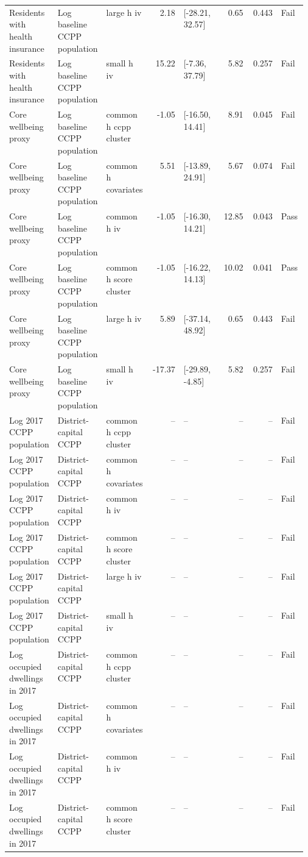 \begin{longtable}{@{}p{0.16\linewidth}p{0.14\linewidth}p{0.14\linewidth}rp{0.13\linewidth}rrl@{}}
Residents with health insurance & Log baseline CCPP population & large h iv & 2.18 & [-28.21, 32.57] & 0.65 & 0.443 & Fail \\
Residents with health insurance & Log baseline CCPP population & small h iv & 15.22 & [-7.36, 37.79] & 5.82 & 0.257 & Fail \\
Core wellbeing proxy & Log baseline CCPP population & common h ccpp cluster & -1.05 & [-16.50, 14.41] & 8.91 & 0.045 & Fail \\
Core wellbeing proxy & Log baseline CCPP population & common h covariates & 5.51 & [-13.89, 24.91] & 5.67 & 0.074 & Fail \\
Core wellbeing proxy & Log baseline CCPP population & common h iv & -1.05 & [-16.30, 14.21] & 12.85 & 0.043 & Pass \\
Core wellbeing proxy & Log baseline CCPP population & common h score cluster & -1.05 & [-16.22, 14.13] & 10.02 & 0.041 & Pass \\
Core wellbeing proxy & Log baseline CCPP population & large h iv & 5.89 & [-37.14, 48.92] & 0.65 & 0.443 & Fail \\
Core wellbeing proxy & Log baseline CCPP population & small h iv & -17.37 & [-29.89, -4.85] & 5.82 & 0.257 & Fail \\
Log 2017 CCPP population & District-capital CCPP & common h ccpp cluster & -- & -- & -- & -- & Fail \\
Log 2017 CCPP population & District-capital CCPP & common h covariates & -- & -- & -- & -- & Fail \\
Log 2017 CCPP population & District-capital CCPP & common h iv & -- & -- & -- & -- & Fail \\
Log 2017 CCPP population & District-capital CCPP & common h score cluster & -- & -- & -- & -- & Fail \\
Log 2017 CCPP population & District-capital CCPP & large h iv & -- & -- & -- & -- & Fail \\
Log 2017 CCPP population & District-capital CCPP & small h iv & -- & -- & -- & -- & Fail \\
Log occupied dwellings in 2017 & District-capital CCPP & common h ccpp cluster & -- & -- & -- & -- & Fail \\
Log occupied dwellings in 2017 & District-capital CCPP & common h covariates & -- & -- & -- & -- & Fail \\
Log occupied dwellings in 2017 & District-capital CCPP & common h iv & -- & -- & -- & -- & Fail \\
Log occupied dwellings in 2017 & District-capital CCPP & common h score cluster & -- & -- & -- & -- & Fail \\

\end{longtable}
